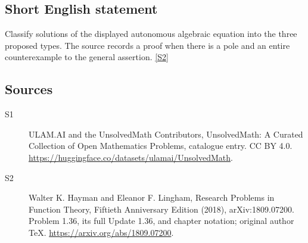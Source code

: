 \documentclass[11pt]{article}
\newcommand{\sref}[2]{\hyperlink{source:#1:#2}{[S#2]}}
\begin{document}
\subsection{Short English statement}
Classify solutions of the displayed autonomous algebraic equation into the three proposed types. The source records a proof when there is a pole and an entire counterexample to the general assertion. \sref{statement}{2}
\subsection{Sources}
\begin{description}
\item[\hypertarget{source:statement:1}{S1}] ULAM.AI and the UnsolvedMath Contributors, UnsolvedMath: A Curated Collection of Open Mathematics Problems, catalogue entry. CC BY 4.0. \url{https://huggingface.co/datasets/ulamai/UnsolvedMath}.
\item[\hypertarget{source:statement:2}{S2}] Walter K. Hayman and Eleanor F. Lingham, Research Problems in Function Theory, Fiftieth Anniversary Edition (2018), arXiv:1809.07200. Problem 1.36, its full Update 1.36, and chapter notation; original author TeX. \url{https://arxiv.org/abs/1809.07200}.
\end{description}
\label{end:statement}
\end{document}
